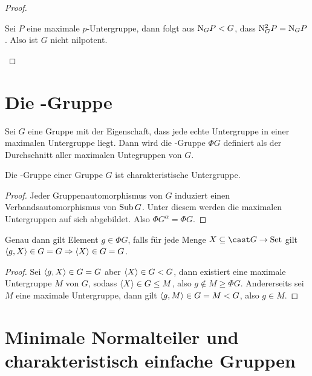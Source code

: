 \begin{proof}
    \begin{statements}
        \item Sei $P$ eine maximale $p$-Untergruppe, dann folgt aus $\mathrm{N}_G P < G$, dass $\mathrm{N}^2_G P = \mathrm{N}_G
    P$. Also ist $G$ nicht nilpotent.
    \end{statements}
\end{proof}

\section{Die -Gruppe}

\begin{definition}
    Sei $G$ eine Gruppe mit der Eigenschaft, dass jede echte Untergruppe in einer maximalen Untergruppe liegt. Dann wird die -Gruppe $\Phi G$ definiert als der Durchschnitt aller maximalen Untegruppen von $G$.
\end{definition}

\begin{lemma}
    Die -Gruppe einer Gruppe $G$ ist charakteristische Untergruppe.
\end{lemma}

\begin{proof}
    Jeder Gruppenautomorphismus von $G$ induziert einen Verbandsautomorphismus von $\mathop{\mathrm{Sub}} G$. Unter diesem werden die maximalen
    Untergruppen auf sich abgebildet. Also $\Phi G^\alpha=\Phi G$.
\end{proof}

\begin{lemma}
    Genau dann gilt Element $g\in\Phi G$, falls für jede Menge $X\setleq \cast G\to \set$ gilt $\left\langle g,X\right\rangle\in G=G \Rightarrow \left\langle X\right\rangle\in G = G$. 
\end{lemma}

\begin{proof}
    Sei $\left\langle g,X\right\rangle\in G = G$ aber $\left\langle X\right\rangle \in G < G$, dann existiert eine maximale Untergruppe $M$ von $G$, sodass $\left\langle X\right\rangle \in
    G\leq M$, also $g\not\in M\geq \Phi G$.
    Andererseits sei $M$ eine maximale Untergruppe, dann gilt $\left\langle g,M\right\rangle\in G= M<G$, also $g\in M$.
\end{proof}

\section{Minimale Normalteiler und charakteristisch einfache Gruppen}

